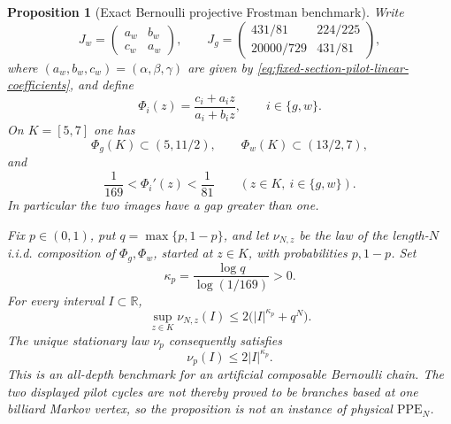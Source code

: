 \documentclass[11pt]{article}
\newtheorem{proposition}[theorem]{Proposition}
\begin{document}
\begin{proposition}[Exact Bernoulli projective Frostman benchmark]
\label{prop:fixed-section-bernoulli-projective-benchmark}
Write
\[
 J_w=\begin{pmatrix}a_w&b_w\\c_w&a_w\end{pmatrix},
 \qquad
 J_g=\begin{pmatrix}431/81&224/225\\20000/729&431/81\end{pmatrix},
\]
where $(a_w,b_w,c_w)=(\alpha,\beta,\gamma)$ are given by
\eqref{eq:fixed-section-pilot-linear-coefficients}, and define
\[
 \Phi_i(z)=\frac{c_i+a_i z}{a_i+b_i z},
 \qquad i\in\{g,w\}.
\]
On $K=[5,7]$ one has
\begin{equation}
\label{eq:bernoulli-projective-separated-images}
 \Phi_g(K)\subset(5,11/2),\qquad
 \Phi_w(K)\subset(13/2,7),
\end{equation}
and
\begin{equation}
\label{eq:bernoulli-projective-derivative-window}
 \frac1{169}<\Phi_i'(z)<\frac1{81}
 \qquad(z\in K,\ i\in\{g,w\}).
\end{equation}
In particular the two images have a gap greater than one.

Fix $p\in(0,1)$, put $q=\max\{p,1-p\}$, and let $\nu_{N,z}$ be the law of
the length-$N$ i.i.d. composition of $\Phi_g,\Phi_w$, started at
$z\in K$, with probabilities $p,1-p$.  Set
\[
 \kappa_p=\frac{\log q}{\log(1/169)}>0.
\]
For every interval $I\subset\mathbb R$,
\begin{equation}
\label{eq:bernoulli-projective-finite-frostman}
 \sup_{z\in K}\nu_{N,z}(I)
 \le2\bigl(|I|^{\kappa_p}+q^N\bigr).
\end{equation}
The unique stationary law $\nu_p$ consequently satisfies
\begin{equation}
\label{eq:bernoulli-projective-stationary-frostman}
 \nu_p(I)\le2|I|^{\kappa_p}.
\end{equation}
This is an all-depth benchmark for an artificial composable Bernoulli
chain.  The two displayed pilot cycles are not thereby proved to be
branches based at one billiard Markov vertex, so the proposition is not an
instance of physical $\mathrm{PPE}_N$.
\end{proposition}
\end{document}
